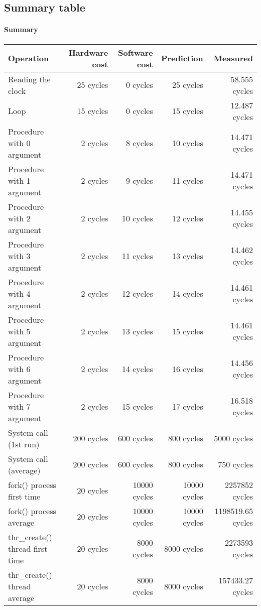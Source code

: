 \subsection{Summary table}

\paragraph{Summary}

\begin{table}[h]
\begin{center}
\begin{tabular}{| l | r | r | r | r |} \hline
Operation 			& Hardware cost 	& Software cost 	& Prediction	& Measured \\ \hline
Reading the clock 	& 25 cycles		& 0 cycles			& 25 cycles 	& 58.555 cycles \\ \hline
Loop 				& 15 cycles 		& 0 cycles 		& 15 cycles 	& 12.487 cycles \\ \hline \hline

Procedure with 0 argument & 2 cycles 	& 8 cycles  		& 10 cycles 	& 14.471 cycles \\ \hline
Procedure with 1 argument  & 2 cycles 	& 9 cycles  		& 11 cycles 	& 14.471 cycles \\ \hline
Procedure with 2 argument  & 2 cycles 	& 10 cycles  		& 12 cycles 	& 14.455 cycles \\ \hline
Procedure with 3 argument  & 2 cycles 	& 11 cycles 		& 13 cycles 	& 14.462 cycles \\ \hline
Procedure with 4 argument  & 2 cycles 	& 12 cycles 		& 14 cycles 	& 14.461 cycles \\ \hline
Procedure with 5 argument  & 2 cycles 	& 13 cycles 		& 15 cycles 	& 14.461 cycles \\ \hline
Procedure with 6 argument  & 2 cycles 	& 14 cycles 		& 16 cycles 	& 14.456 cycles \\ \hline
Procedure with 7 argument  & 2 cycles 	& 15 cycles 		& 17 cycles 	& 16.518 cycles \\ \hline\hline

System call (1st run) & 200 cycles & 600 cycles & 800 cycles & 5000 cycles\\
\hline
System call (average) & 200 cycles & 600 cycles & 800 cycles & 750 cycles\\
\hline\hline

fork() process first time		& 20 cycles & 10000 cycles 	& 10000 cycles& 2257852 cycles \\ \hline
fork() process average		& 20 cycles & 10000 cycles 	& 10000 cycles& 1198519.65 cycles \\ \hline
thr\_create() thread first time	& 20 cycles & 8000 cycles		& 8000 cycles &  2273593 cycles \\ \hline
thr\_create() thread 	average	& 20 cycles & 8000 cycles		& 8000 cycles &  157433.27 cycles \\ \hline\hline



\end{tabular}
\end{center}
\end{table}
